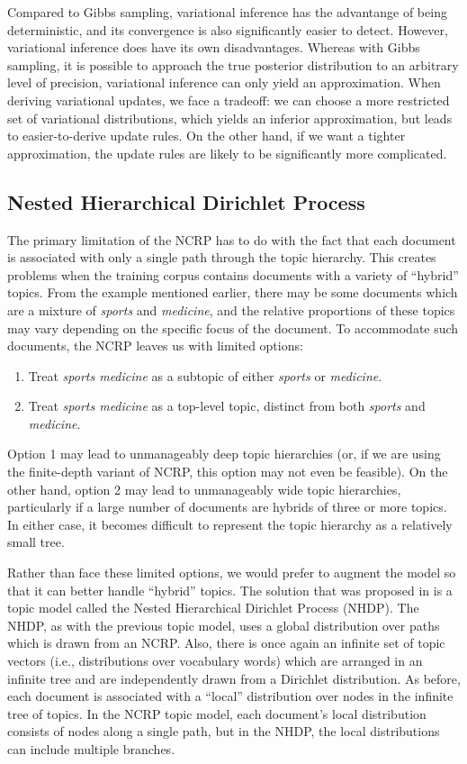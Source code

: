 \documentclass{article}
\begin{document}

Compared to Gibbs sampling, variational inference has the advantange of being deterministic, and its convergence is also significantly easier to detect.
However, variational inference does have its own disadvantages.
Whereas with Gibbs sampling, it is possible to approach the true posterior distribution to an arbitrary level of precision, variational inference can only yield an approximation.
When deriving variational updates, we face a tradeoff: we can choose a more restricted set of variational distributions, which yields an inferior approximation, but leads to easier-to-derive update rules.
On the other hand, if we want a tighter approximation, the update rules are likely to be significantly more complicated.

\subsection{Nested Hierarchical Dirichlet Process}

The primary limitation of the NCRP has to do with the fact that each document is associated with only a single path through the topic hierarchy.
This creates problems when the training corpus contains documents with a variety of ``hybrid'' topics.
From the example mentioned earlier, there may be some documents which are a mixture of \emph{sports} and \emph{medicine}, and the relative proportions of these topics may vary depending on the specific focus of the document.
To accommodate such documents, the NCRP leaves us with limited options:
\begin{enumerate}
\item Treat \emph{sports medicine} as a subtopic of either \emph{sports} or \emph{medicine}.
\item Treat \emph{sports medicine} as a top-level topic, distinct from both \emph{sports} and \emph{medicine}.
\end{enumerate}
Option 1 may lead to unmanageably deep topic hierarchies (or, if we are using the finite-depth variant of NCRP, this option may not even be feasible).
On the other hand, option 2 may lead to unmanageably wide topic hierarchies, particularly if a large number of documents are hybrids of three or more topics.
In either case, it becomes difficult to represent the topic hierarchy as a relatively small tree.

Rather than face these limited options, we would prefer to augment the model so that it can better handle ``hybrid'' topics.
The solution that was proposed in \cite{paisley2015nhdp} is a topic model called the Nested Hierarchical Dirichlet Process (NHDP).
The NHDP, as with the previous topic model, uses a global distribution over paths which is drawn from an NCRP.
Also, there is once again an infinite set of topic vectors (i.e., distributions over vocabulary words) which are arranged in an infinite tree and are independently drawn from a Dirichlet distribution.
As before, each document is associated with a ``local'' distribution over nodes in the infinite tree of topics.
In the NCRP topic model, each document's local distribution consists of nodes along a single path, but in the NHDP, the local distributions can include multiple branches.
\end{document}
